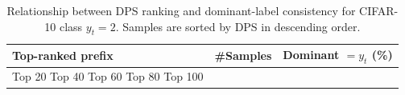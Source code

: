 \begin{table}[t]
\centering
\begin{tabular}{lrr}
\toprule
Top-ranked prefix & \#Samples & Dominant $= y_t$ (\%) \\
\midrule
Top 20%
Top 40%
Top 60%
Top 80%
Top 100%
\bottomrule
\caption{Relationship between DPS ranking and dominant-label consistency for CIFAR-10 class $y_t=2$. Samples are sorted by DPS in descending order.}
\label{tab:class_2_prefix}
\end{tabular}
\end{table}
